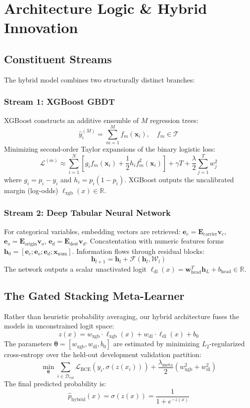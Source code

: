 \documentclass[conference]{IEEEtran}
\begin{document}
\section{Architecture Logic \& Hybrid Innovation}
\subsection{Constituent Streams}
The hybrid model combines two structurally distinct branches:

\subsubsection{Stream 1: XGBoost GBDT}
XGBoost constructs an additive ensemble of $M$ regression trees:
$$\hat{y}_i^{(M)} = \sum_{m=1}^M f_m(\mathbf{x}_i), \quad f_m \in \mathcal{T}$$
Minimizing second-order Taylor expansions of the binary logistic loss:
$$\mathcal{L}^{(m)} \approx \sum_{i=1}^N \left[ g_i f_m(\mathbf{x}_i) + \frac{1}{2} h_i f_m^2(\mathbf{x}_i) \right] + \gamma T + \frac{\lambda}{2} \sum_{j=1}^T w_j^2$$
where $g_i = p_i - y_i$ and $h_i = p_i(1 - p_i)$. XGBoost outputs the uncalibrated margin (log-odds) $\ell_{\text{xgb}}(x) \in \mathbb{R}$.

\subsubsection{Stream 2: Deep Tabular Neural Network}
For categorical variables, embedding vectors are retrieved: $\mathbf{e}_c = \mathbf{E}_{\text{carrier}} \mathbf{v}_c$, $\mathbf{e}_o = \mathbf{E}_{\text{origin}} \mathbf{v}_o$, $\mathbf{e}_d = \mathbf{E}_{\text{dest}} \mathbf{v}_d$. Concatentation with numeric features forms $\mathbf{h}_0 = [\mathbf{e}_c; \mathbf{e}_o; \mathbf{e}_d; \mathbf{x}_{\text{num}}]$. Information flows through residual blocks:
$$\mathbf{h}_{l+1} = \mathbf{h}_l + \mathcal{F}(\mathbf{h}_l, \mathcal{W}_l)$$
The network outputs a scalar unactivated logit $\ell_{\text{dl}}(x) = \mathbf{w}_{\text{head}}^T \mathbf{h}_L + b_{\text{head}} \in \mathbb{R}$.

\subsection{The Gated Stacking Meta-Learner}
Rather than heuristic probability averaging, our hybrid architecture fuses the models in unconstrained logit space:
$$z(x) = w_{\text{xgb}} \cdot \ell_{\text{xgb}}(x) + w_{\text{dl}} \cdot \ell_{\text{dl}}(x) + b_0$$
The parameters $\bm{\theta} = [w_{\text{xgb}}, w_{\text{dl}}, b_0]$ are estimated by minimizing $L_2$-regularized cross-entropy over the held-out development validation partition:
$$\min_{\bm{\theta}} \sum_{i \in \mathcal{D}_{\text{val}}} \mathcal{L}_{\text{BCE}}\left(y_i, \sigma(z(x_i))\right) + \frac{\lambda_{\text{meta}}}{2} \left(w_{\text{xgb}}^2 + w_{\text{dl}}^2\right)$$
The final predicted probability is:
$$\hat{p}_{\text{hybrid}}(x) = \sigma(z(x)) = \frac{1}{1 + e^{-z(x)}}$$
\end{document}

